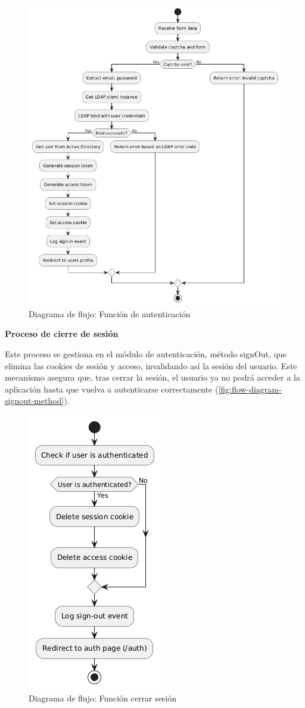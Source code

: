 \begin{figure}[h]
    \centering
    \includegraphics[scale=0.5]{images/puml/flow-diagram-signin/flow-diagram-signin.png}
    \caption{Diagrama de flujo: Función de autenticación}
    \label{fig:flow-diagram-auth-method}
\end{figure}

\textbf{Proceso de cierre de sesión}

Este proceso se gestiona en el módulo de autenticación, método signOut, que elimina las cookies de sesión y acceso, invalidando así la sesión del usuario. Este mecanismo asegura que, tras cerrar la sesión, el usuario ya no podrá acceder a la aplicación hasta que vuelva a autenticarse correctamente (\autoref{fig:flow-diagram-signout-method}).

\begin{figure}[h]
    \centering
    \includegraphics[scale=0.6]{images/puml/flow-diagram-signout/flow-diagram signout.png}
    \caption{Diagrama de flujo: Función cerrar sesión}
    \label{fig:flow-diagram-signout-method}
\end{figure}